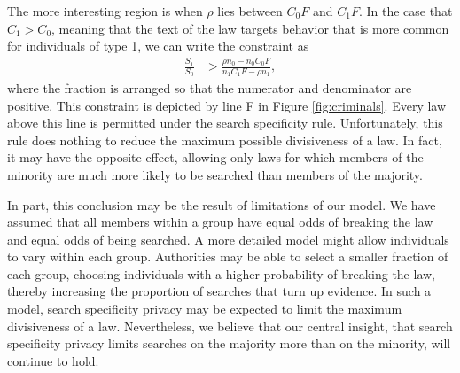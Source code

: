 The more interesting region is when $\rho$ lies between  $C_0F$ and $C_1 F$.  In the case that $C_1 > C_0$, meaning that the text of the law targets behavior that is more common for individuals of type 1, we can write the constraint as
\begin{align}
\frac{S_1}{S_0} &>  \frac{\rho n_0 - n_0 C_0F }{n_1 C_1F - \rho n_1},
\end{align}
where the fraction is arranged so that the numerator and denominator are positive.  This constraint is depicted by line F in Figure \ref{fig:criminals}.  Every law above this line is permitted under the search specificity rule.  Unfortunately, this rule does nothing to reduce the maximum possible divisiveness of a law.  In fact, it may have the opposite effect, allowing only laws for which members of the minority are much more likely to be searched than members of the majority.

In part, this conclusion may be the result of limitations of our model.  We have assumed that all members within a group have equal odds of breaking the law and equal odds of being searched.  A more detailed model might allow individuals to vary within each group.  Authorities may be able to select a smaller fraction of each group, choosing individuals with a higher probability of breaking the law, thereby increasing the proportion of searches that turn up evidence.  In such a model, search specificity privacy may be expected to limit the maximum divisiveness of a law.  Nevertheless, we believe that our central insight, that search specificity privacy limits searches on the majority more than on the minority, will continue to hold.






